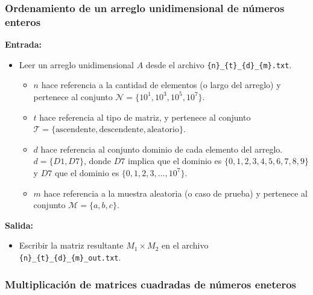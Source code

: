 \subsubsection{Ordenamiento de un arreglo unidimensional de números enteros}

\textbf{Entrada:}
\begin{itemize}
    \item Leer un arreglo unidimensional $A$ desde el archivo \texttt{\{n\}\_\{t\}\_\{d\}\_\{m\}.txt}.
    \begin{itemize}
        \item $n$ hace referencia a la cantidad de elementos (o largo del arreglo) y pertenece al conjunto $\mathcal{N} = \{10^1, 10^3, 10^5, 10^{7}\}$.
        \item $t$ hace referencia al tipo de matriz, y pertenece al conjunto $\mathcal{T} = \{ \text{ascendente}, \text{descendente}, \text{aleatorio} \}$.
        \item $d$ hace referencia al conjunto dominio de cada elemento del arreglo. $d = \{D1, D7\}$, donde $D7$ implica que el dominio es $\{0,1,2,3,4,5,6,7,8,9\}$ y $D7 $ que el dominio es $ \{0,1,2,3,...,10^7\}$.
        \item $m$ hace referencia a la muestra aleatoria (o caso de prueba) y pertenece al conjunto $\mathcal{M} = \{a,b,c\}$.
    \end{itemize}
\end{itemize}

\textbf{Salida:}
\begin{itemize}
    \item Escribir la matriz resultante $M_1 \times M_2$ en el archivo \texttt{\{n\}\_\{t\}\_\{d\}\_\{m\}\_out.txt}.
\end{itemize}

\subsubsection{Multiplicación de matrices cuadradas de números eneteros}

